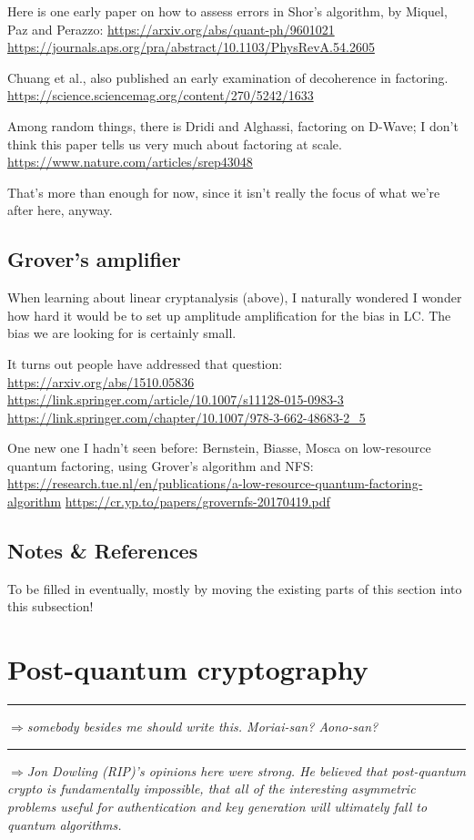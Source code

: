 \documentclass[%
 aip,
 jmp,%
 amsmath,amssymb,
 reprint,%
]{revtex4-1}
\def\outlinecomment#1{\hrule{\color{Blue}$\Rightarrow${\small\em #1}}\hrule}
\def\comment#1{{\color{ForestGreen}$\Rightarrow${\small\em #1}}}
\begin{document}
Here is one early paper on how to assess errors in Shor’s algorithm,
by Miquel, Paz and Perazzo:
\url{https://arxiv.org/abs/quant-ph/9601021}
\url{https://journals.aps.org/pra/abstract/10.1103/PhysRevA.54.2605}

Chuang et al., also published an early examination of decoherence in
factoring.
\url{https://science.sciencemag.org/content/270/5242/1633}

Among random things, there is Dridi and Alghassi,
factoring on D-Wave; I don’t think this paper tells us very much about factoring at scale.
\url{https://www.nature.com/articles/srep43048}

That's more than enough for now, since it isn't really the focus of
what we're after here, anyway.

\subsection{Grover's amplifier}

When learning about linear cryptanalysis (above), I naturally wondered
I wonder how hard it would be to set up amplitude amplification for
the bias in LC.  The bias we are looking for is certainly small.

It turns out people have addressed that question:
\url{https://arxiv.org/abs/1510.05836}
\url{https://link.springer.com/article/10.1007/s11128-015-0983-3}
\url{https://link.springer.com/chapter/10.1007/978-3-662-48683-2_5}

One new one I hadn't seen before:
Bernstein, Biasse, Mosca on low-resource quantum factoring, using
Grover's algorithm and NFS:
\url{https://research.tue.nl/en/publications/a-low-resource-quantum-factoring-algorithm}
\url{https://cr.yp.to/papers/grovernfs-20170419.pdf}

\subsection{Notes \& References}

To be filled in eventually, mostly by moving the existing parts of
this section into this subsection!

\section{Post-quantum cryptography}

\outlinecomment{somebody besides me should write this.  Moriai-san?
  Aono-san?}

\comment{Jon Dowling (RIP)'s opinions here were strong.  He believed that
  post-quantum crypto is fundamentally impossible, that all of the
  interesting asymmetric problems useful for authentication and key
  generation will ultimately fall to quantum algorithms.}
\end{document}
